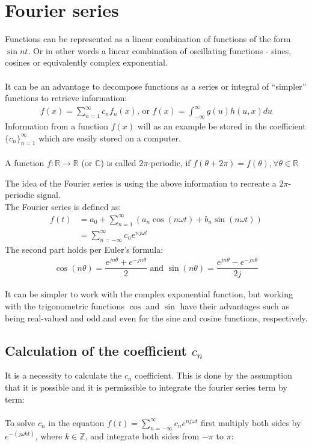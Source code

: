 \section{Fourier series}
Functions can be represented as a linear combination of functions of the form $\sin nt$.
Or in other words a linear combination of oscillating functions - sines, cosines or equivalently complex exponential.
\\\\
It can be an advantage to decompose functions as a series or integral of ``simpler'' functions to retrieve information:
\begin{align*}
	f(x) = \sum_{n=1}^\infty c_n f_n(x)\text{, or } f(x)= \int_{-\infty}^\infty g(u) h(u,x) du
\end{align*}
Information from a function $f(x)$ will as an example be stored in the coefficient $\{c_n\}_{n=1}^\infty$ which are easily stored on a computer.
\\\\ 
A function $f: \mathbb{R}\to\mathbb{R}$ (or $\mathbb{C}$) is called $2\pi$-periodic, if $f(\theta + 2\pi) = f(\theta), \forall\theta\in\mathbb{R}$

The idea of the Fourier series is using the above information to recreate a $2\pi$-periodic signal.\\
The Fourier series is defined as:
\begin{align*}
	f(t) &= a_0 + \sum_{n=1}^\infty(a_n \cos(n \omega t) + b_n \sin(n \omega t))\\
	&= \sum_{n=-\infty}^{\infty} c_n e^{n j\omega t} 
\end{align*}
The second part holds per Euler's formula:
\begin{align*}
	\cos(n\theta) = \dfrac{e^{j n \theta} + e^{-j n \theta}}{2} \text{ and } \sin(n \theta) = \dfrac{e^{jn\theta}-e^{-jn\theta}}{2j}
\end{align*}

It can be simpler to work with the complex exponential function, but working with the trigonometric functions $\cos$ and $\sin$ have their advantages such as being real-valued and odd and even for the sine and cosine functions, respectively.

\subsection{Calculation of the coefficient $c_n$}
It is a necessity to calculate the $c_n$ coefficient.
This is done by the assumption that it is possible and it is permissible to integrate the fourier series term by term:\\
\\
To solve $c_n$ in the equation $f(t)= \sum_{n=-\infty}^{\infty} c_n e^{n j\omega t}$ first multiply both sides by $e^{-(j\omega k t)}$, where $k\in \mathbb{Z}$, and integrate both sides from $-\pi$ to $\pi$:


